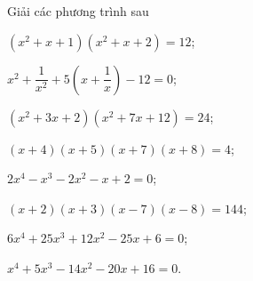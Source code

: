 \begin{bt}
{	}
\end{bt}

\begin{bt}
	Giải các phương trình sau
	\begin{enumEX}{2}
		\item $(x^2+x+1)(x^2+x+2)=12$;
		\item $x^2+\dfrac{1}{x^2}+5\left( x+\dfrac{1}{x}\right)-12=0$;
		\item $(x^2+3x+2)(x^2+7x+12)=24$;
		\item $(x+4)(x+5)(x+7)(x+8)=4$;
		\item $2x^4-x^3-2x^2-x+2=0$;
		\item $(x+2)(x+3)(x-7)(x-8)=144$;
		\item $6x^4+25x^3+12x^2-25x+6=0$;
		\item $x^4+5x^3-14x^2-20x+16=0$.
	\end{enumEX}
\end{bt}
